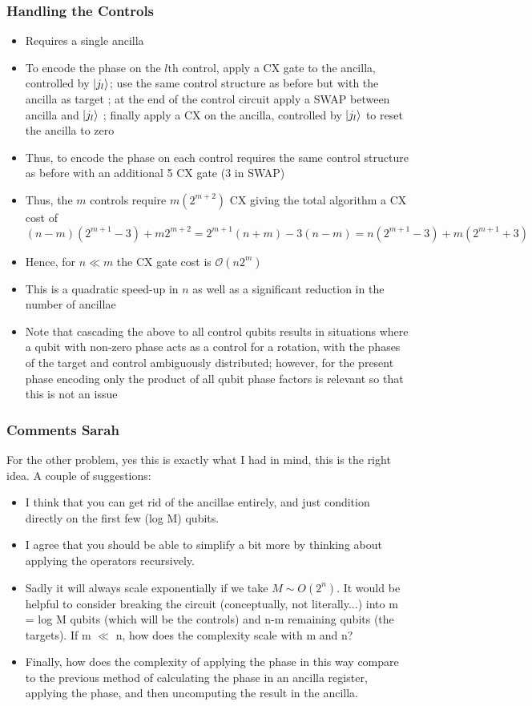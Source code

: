 \documentclass{beamer}
\begin{document}
\begin{frame}
\frametitle{Handling the Controls}
\begin{itemize}
\item Requires a single ancilla 
\item To encode the phase on the $l$th control, apply a CX gate to the ancilla, controlled by $\ket{j_l}$; use the same control structure as before but with the ancilla as target ; at the end of the control circuit apply a SWAP between ancilla and $\ket{j_l}$ ; finally apply a CX on the ancilla, controlled by $\ket{j_l}$ to reset the ancilla to zero 
\item Thus, to encode the phase on each control requires the same control structure as before with an additional 5 CX gate (3 in SWAP)
\item Thus, the $m$ controls require $m (2^{m+2})$ CX giving the total algorithm a CX cost of 
\begin{equation}
(n-m) (2^{m+1} -3) + m 2^{m+2} = 2^{m +1} \left( n + m  \right) - 3 (n-m) = n (2^{m+1} -3) + m (2^{m+1} +3)
\end{equation}
\item Hence, for $n \ll m$ the CX gate cost is $\mathcal{O}(n 2^m)$
\item This is a quadratic speed-up in $n$ as well as a significant reduction in the number of ancillae 
\item Note that cascading the above to all control qubits results in situations where a qubit with non-zero phase acts as a control for a rotation, with the phases of the target and control ambiguously distributed; however, for the present phase encoding only the product of all qubit phase factors is relevant so that this is not an issue  
\end{itemize}

\end{frame}

\begin{frame}
\frametitle{Comments Sarah}
For the other problem, yes this is exactly what I had in mind, this is the right idea. A couple of suggestions:
\begin{itemize}
\item I think that you can get rid of the ancillae entirely, and just condition directly on the first few (log M) qubits.
\item I agree that you should be able to simplify a bit more by thinking about applying the operators recursively.
\item Sadly it will always scale exponentially if we take $M \sim O(2^n)$. It would be helpful to consider breaking the circuit (conceptually, not literally...) into m = log M qubits (which will be the controls) and n-m remaining qubits (the targets). If m $\ll$ n, how does the complexity scale with m and n?
\item Finally, how does the complexity of applying the phase in this way compare to the previous method of calculating the phase in an ancilla register, applying the phase, and then uncomputing the result in the ancilla.
\end{itemize}

\end{frame}
\end{document}
